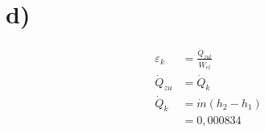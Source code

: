 

\section*{d)}

\begin{align*}
    \varepsilon_k &= \frac{\dot{Q}_{zul}}{\dot{W}_{el}} \\
    \dot{Q}_{zu} &= \dot{Q}_k \\
    \dot{Q}_k &= \dot{m}(h_2 - h_1) \\
    &= 0,000834
\end{align*}